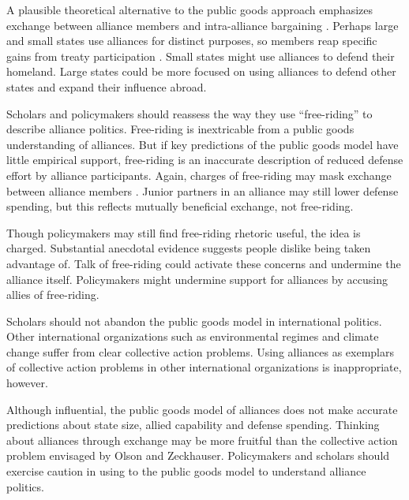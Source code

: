 \documentclass[12pt]{article}
\begin{document}
A plausible theoretical alternative to the public goods approach emphasizes exchange between alliance members and intra-alliance bargaining \citep{Norrlof2010, Brooksetal2013, Kim2016}. 
Perhaps large and small states use alliances for distinct purposes, so members reap specific gains from treaty participation \citep{Morrow1991, Johnson2015}. 
Small states might use alliances to defend their homeland. 
Large states could be more focused on using alliances to defend other states and expand their influence abroad. 


Scholars and policymakers should reassess the way they use ``free-riding'' to describe alliance politics. 
Free-riding is inextricable from a public goods understanding of alliances.
But if key predictions of the public goods model have little empirical support, free-riding is an inaccurate description of reduced defense effort by alliance participants.  
Again, charges of free-riding may mask exchange between alliance members \citep{Lanoszka2015}. 
Junior partners in an alliance may still lower defense spending, but this reflects mutually beneficial exchange, not free-riding. 


Though policymakers may still find free-riding rhetoric useful, the idea is charged. 
Substantial anecdotal evidence suggests people dislike being taken advantage of. 
Talk of free-riding could activate these concerns and undermine the alliance itself.
Policymakers might undermine support for alliances by accusing allies of free-riding. 


Scholars should not abandon the public goods model in international politics. 
Other international organizations such as environmental regimes and climate change suffer from clear collective action problems.  
Using alliances as exemplars of collective action problems in other international organizations is inappropriate, however. 


Although influential, the public goods model of alliances does not make accurate predictions about state size, allied capability and defense spending. 
Thinking about alliances through exchange may be more fruitful than the collective action problem envisaged by Olson and Zeckhauser.
Policymakers and scholars should exercise caution in using to the public goods model to understand alliance politics.  



\singlespace


 
\end{document}
